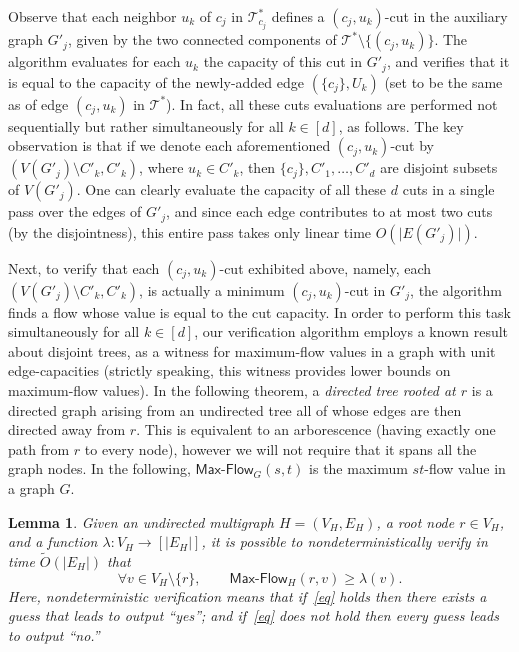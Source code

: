 \documentclass[11pt]{article}
\numberwithin{equation}{section}
\newtheorem{lemma}[theorem]{Lemma}
\theoremstyle{definition}
\theoremstyle{plain}
\theoremstyle{plain}
\newcommand{\ProblemName}[1]{\textsf{#1}}
\newcommand{\MF}{\ProblemName{Max-Flow}\xspace}
\newcommand\tO{\ensuremath{\widetilde O}}  %
\newcommand{\TG}{\mathcal{T}^*}
\providecommand{\set}[1]{{\{#1\}}}
\providecommand{\card}[1]{\lvert#1\rvert}
\begin{document}
Observe that each neighbor $u_k$ of $c_j$ in $\TG_{c_j}$
defines a $(c_j,u_k)$-cut in the auxiliary graph $G'_j$,
given by the two connected components of $\TG\setminus \set{(c_j,u_k)}$.
The algorithm evaluates for each $u_k$ the capacity of this cut in $G'_j$,
and verifies that it is equal to the capacity of the newly-added edge $(\set{c_j}, U_k)$ (set to be the same as of edge $(c_j, u_k)$ in $\TG$).
In fact, all these cuts evaluations are performed not sequentially
but rather simultaneously for all $k\in [d]$, as follows.
The key observation is that if we denote
each aforementioned $(c_j,u_k)$-cut by $(V(G'_j)\setminus C'_k, C'_k)$,
where $u_k\in C'_k$,
then $\set{c_j},C'_1,\ldots,C'_d$ are disjoint subsets of $V(G'_j)$.
One can clearly evaluate the capacity of all these $d$ cuts
in a single pass over the edges of $G'_j$,
and since each edge contributes to at most two cuts (by the disjointness),
this entire pass takes only linear time $O(\card{E(G'_j)})$.

Next, to verify that each $(c_j,u_k)$-cut exhibited above,
namely, each $(V(G'_j)\setminus C'_k, C'_k)$,
is actually a minimum $(c_j,u_k)$-cut in $G'_j$,
the algorithm finds a flow whose value is equal to the cut capacity.
In order to perform this task simultaneously for all $k\in[d]$,
our verification algorithm employs a known result about disjoint trees,
as a witness for maximum-flow values in a graph with unit edge-capacities
(strictly speaking, this witness provides lower bounds on maximum-flow values).
In the following theorem, a \emph{directed tree rooted at $r$}
is a directed graph arising from an undirected tree
all of whose edges are then directed away from $r$.
This is equivalent to an arborescence
(having exactly one path from $r$ to every
%
%
node),   %
however we will not require that it spans all the graph nodes. In the following, $\MF_{G}(s,t)$ is the maximum $st$-flow value in a graph $G$.


\begin{lemma}\label{lemma:packing}
Given an undirected multigraph $H=(V_H,E_H)$, a root node $r\in V_H$, and a function $\lambda:V_H\rightarrow [\card{E_H}]$, it is possible to nondeterministically verify in time $\tO(\card{E_H})$ that
\begin{equation}\label{eq}
  \forall v\in V_H\setminus\set{r},
  \qquad
  \MF_{H}(r,v)\geq \lambda(v).
\end{equation}
Here, nondeterministic verification means that
if~\eqref{eq} holds then there exists a guess that leads to output ``yes'';
and if~\eqref{eq} does not hold then every guess leads to output ``no.''
\end{lemma}
\end{document}
